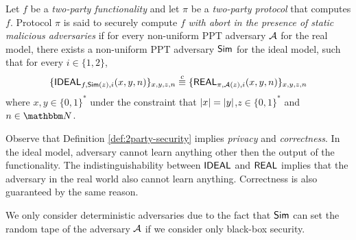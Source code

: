 \begin{definition}Let $f$ be a {\it two-party functionality} and let $\pi$ be a {\it two-party protocol} that computes $f$. Protocol $\pi$ is said to {\sf securely compute} $f$ {\it with abort in the presence of static malicious adversaries} if for every non-uniform PPT adversary $\mathcal{A}$ for the real model, there exists a non-uniform PPT adversary ${\sf Sim}$ for the ideal model, such that for every $i\in\{1,2\}$,
$$\{{\sf IDEAL}_{f,{\sf Sim}(z),i}(x,y,n)\}_{x,y,z,n}\stackrel{c}{\equiv}\{{\sf REAL}_{\pi,\mathcal{A}(z),i}(x,y,n)\}_{x,y,z,n}$$
where $x,y\in\{0,1\}^*$ under the constraint that $\left|x\right|=\left|y\right|$,$z\in\{0,1\}^*$ and $n\in\N$.
\label{def:2party-security}
\end{definition}
\begin{remark}
Observe that Definition \ref{def:2party-security} implies {\it privacy} and {\it correctness}. In the ideal model, adversary cannot learn anything other then the output of the functionality. The indistinguishability between ${\sf IDEAL}$ and ${\sf REAL}$ implies that the adversary in the real world also cannot learn anything. Correctness is also guaranteed by the same reason.
\end{remark}
\begin{remark} We only consider deterministic adversaries due to the fact that ${\sf Sim}$ can set the random tape of the adversary $\mathcal{A}$ if we consider only black-box security.
\end{remark}
